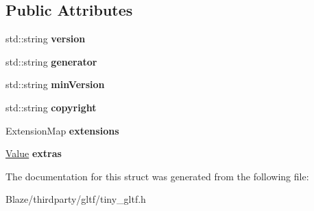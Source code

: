 \subsection*{Public Attributes}
\begin{DoxyCompactItemize}
\item 
\mbox{\label{structtinygltf_1_1Asset_a491f31508a32737ec48dba20267199e0}} 
std\+::string {\bfseries version}
\item 
\mbox{\label{structtinygltf_1_1Asset_a191c0883967fb20390e27af43a353beb}} 
std\+::string {\bfseries generator}
\item 
\mbox{\label{structtinygltf_1_1Asset_af98ba5cfd1413cfddc8542e6f68c530c}} 
std\+::string {\bfseries min\+Version}
\item 
\mbox{\label{structtinygltf_1_1Asset_a5f342784b81fa39e4b26bef2d5c4fb5a}} 
std\+::string {\bfseries copyright}
\item 
\mbox{\label{structtinygltf_1_1Asset_a8975056743d27ab1703c34063bbe486e}} 
Extension\+Map {\bfseries extensions}
\item 
\mbox{\label{structtinygltf_1_1Asset_accd57575d6e74a9152ab5026ae941d50}} 
\hyperlink{classtinygltf_1_1Value}{Value} {\bfseries extras}
\end{DoxyCompactItemize}


The documentation for this struct was generated from the following file\+:\begin{DoxyCompactItemize}
\item 
Blaze/thirdparty/gltf/tiny\+\_\+gltf.\+h\end{DoxyCompactItemize}
